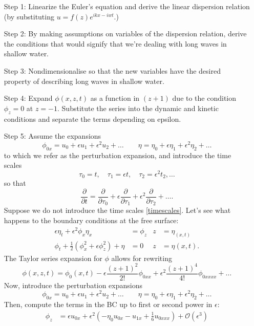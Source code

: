 \documentclass[10pt,reqno,oneside,a4paper]{article}
\begin{document}
\begin{enumerate}
\item[Step 1:] Linearize the Euler's equation and derive the linear dispersion relation (by substituting $u = f(z)e^{ikx - iwt}$.)
\item[Step 2:] By making assumptions on variables of the dispersion relation, derive the conditions that would signify that we're dealing with long waves in shallow water.
\item[Step 3:] Nondimensionalise so that the new variables have the desired property of describing long waves in shallow water.
\item[Step 4:] Expand $\phi(x,z,t)$ as a function in $(z+1)$ due to the condition $\phi_z =0$ at $z = -1.$ Substitute the series into the dynamic and kinetic conditions and separate the terms depending on epsilon.
\item[Step 5:] Assume the expansions 
\[ \phi_{0x} = u_0 + \epsilon u_1 + \epsilon^2 u_2 + \ldots \qquad \eta = \eta_0 + \epsilon \eta_1 + \epsilon^2 \eta_2 + \ldots \]
to which we refer as the perturbation expansion, and introduce the time scales 
\begin{equation}\label{timescales}
\tau_0 = t, \quad \tau_1 = \epsilon t, \quad \tau_2 = \epsilon^2 t_2, \ldots 
\end{equation}
so that 
\[ 
\frac{\partial}{\partial t} = \frac{\partial}{\partial \tau_0} + \epsilon \frac{\partial}{\partial \tau_1} + \epsilon^2 \frac{\partial}{\partial \tau_2} +  \ldots.
\]
Suppose we do not introduce the time scales \eqref{timescales}. Let's see what happens to the boundary conditions at the free surface:
\begin{align*}
\epsilon \eta_t + \epsilon^2 \phi_x \eta_x &= \phi_z &z &= \eta_(x,t) \\
\phi_t + \frac{1}{2} (\phi_x^2 + \epsilon \phi_z^2) + \eta &= 0 &z &= \eta(x, t).
\end{align*}
The Taylor series expansion for $\phi$ allows for rewriting
\[ \phi(x,z,t) = \phi_0(x,t) - \epsilon \frac{(z+1)^2}{2!}\phi_{0xx} + \epsilon^2 \frac{(z+1)^4}{4!}\phi_{0xxxx} + \ldots  \]
Now, introduce the perturbation expansions
\[ 
\phi_{0x} = u_0 + \epsilon u_1 + \epsilon^2 u_2 + \ldots \qquad \eta = \eta_0 + \epsilon \eta_1 + \epsilon^2 \eta_2 + \ldots
\]
Then, compute the terms in the BC up to first or second power in $\epsilon:$
\begin{align*}
\phi_z &= \epsilon u_{0x} + \epsilon^2(-\eta_0 u_{0x} - u_{1x} + \frac{1}{6}u_{0xxx}) + \mathcal{O}(\epsilon^3) \\

\end{align*}
\end{enumerate}
\end{document}
